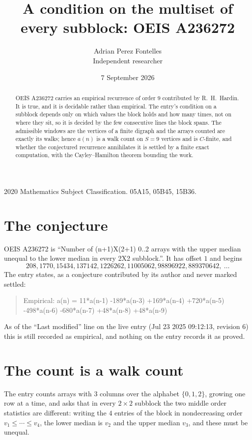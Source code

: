 \documentclass[11pt,a4paper]{article}
\title{A condition on the multiset of every subblock: OEIS A236272}
\author{Adrian Perez Fontelles\\ \small Independent researcher}
\date{7 September 2026}
\theoremstyle{plain}
\theoremstyle{definition}
\begin{document}
\maketitle

\begin{abstract}
OEIS A236272 carries an empirical recurrence of order $9$ contributed by R.~H.~Hardin. It is
true, and it is decidable rather than empirical. The entry's condition on a subblock depends
only on which values the block holds and how many times, not on where they sit, so it is
decided by the few consecutive lines the block spans. The admissible windows are the vertices
of a finite digraph and the arrays counted are exactly its walks; hence $a(n)$ is a walk count
on $S=9$ vertices and is $C$-finite, and whether the conjectured recurrence annihilates it
is settled by a finite exact computation, with the Cayley--Hamilton theorem bounding the
work.
\end{abstract}

\noindent\small 2020 Mathematics Subject Classification. 05A15, 05B45, 15B36.\normalsize

\section{The conjecture}

OEIS A236272 is ``Number of (n+1)X(2+1) 0..2 arrays with the upper median unequal to the lower median in every 2X2 subblock.''. It has offset $1$ and begins
\[
208, 1770, 15434, 137142, 1226262, 11005062, 98896922, 889370642,\ \dots
\]
The entry states, as a conjecture contributed by its author and never marked settled:
\begin{quote}
Empirical: a(n) = 11*a(n-1) -189*a(n-3) +169*a(n-4) +720*a(n-5) -498*a(n-6) -680*a(n-7) +48*a(n-8) +48*a(n-9)
\end{quote}
As of the ``Last modified'' line on the live entry (Jul 23 2025 09:12:13, revision 6) this is still
recorded as empirical, and nothing on the entry records it as proved.

\section{The count is a walk count}

The entry counts arrays with $3$ columns over the alphabet $\{0,1,2\}$, growing one row at a time, and asks that in every $2\times2$ subblock the two middle order statistics are different: writing the $4$ entries of the block in nondecreasing order $v_1\le\cdots\le v_{4}$, the lower median is $v_{2}$ and the upper median $v_{3}$, and these must be unequal.
\end{document}
